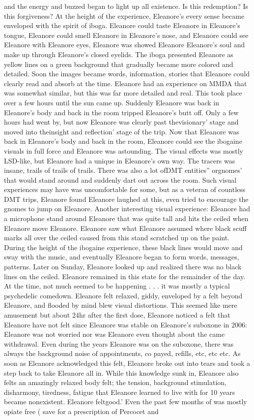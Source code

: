 \documentclass[12pt]{book}
\begin{document}
and the energy and buzzed began to light up all existence. Is this redemption? Is this forgiveness? At the height of the experience, Eleanore's every sense became enveloped with the spirit of iboga. Eleanore could taste Eleanore in Eleanore's tongue, Eleanore could smell Eleanore in Eleanore's nose, and Eleanore could see Eleanore with Eleanore eyes, Eleanore was showed Eleanore Eleanore's soul and make up through Eleanore's closed eyelids. The iboga presented Eleanore as yellow lines on a green background that gradually became more colored and detailed. Soon the images became words, information, stories that Eleanore could clearly read and absorb at the time. Eleanore had an experience on MMDA that was somewhat similar, but this was far more detailed and real. This took place over a few hours until the sun came up. Suddenly Eleanore was back in Eleanore's body and back in the room tripped Eleanore's butt off. Only a few hours had went by, but now Eleanore was clearly past thevisionary' stage and moved into theinsight and reflection' stage of the trip. Now that Eleanore was back in Eleanore's body and back in the room, Eleanore could see the ibogaine visuals in full force and Eleanore was astounding. The visual effects was mostly LSD-like, but Eleanore had a unique in Eleanore's own way. The tracers was insane, trails of trails of trails. There was also a lot ofDMT entities'' orgnomes' that would stand around and suddenly dart out across the room. Such visual experiences may have was uncomfortable for some, but as a veteran of countless DMT trips, Eleanore found Eleanore laughed at this, even tried to encourage the gnomes to jump on Eleanore. Another interesting visual experience: Eleanore had a microphone stand around Eleanore that was quite tall and hits the ceiled when Eleanore move Eleanore. Eleanore saw what Eleanore assumed where black scuff marks all over the ceiled caused from this stand scratched up on the paint. During the height of the ibogaine experience, these black lines would move and sway with the music, and eventually Eleanore began to form words, messages, patterns. Later on Sunday, Eleanore looked up and realized there was no black lines on the ceiled. Eleanore remained in this state for the remainder of the day. At the time, not much seemed to be happening . . . it was mostly a typical psychedelic comedown. Eleanore felt relaxed, giddy, enveloped by a felt beyond Eleanore, and flooded by mind blew visual distortions. This seemed like mere amusement but about 24hr after the first dose, Eleanore noticed a felt that Eleanore have not felt since Eleanore was stable on Eleanore's suboxone in 2006: Eleanore was not worried nor was Eleanore even thought about the came withdrawal. Even during the years Eleanore was on the suboxone, there was always the background noise of appointments, co payed, refills, etc, etc etc. As soon as Eleanore acknowledged this felt, Eleanore broke out into tears and took a step back to take Eleanore all in. While this knowledge sunk in, Eleanore also felts an amazingly relaxed body felt; the tension, background stimulation, disharmony, tiredness, fatigue that Eleanore learned to live with for 10 years became nonexistent. Eleanore feltgood.' Even the past few months of was mostly opiate free ( save for a prescription of Percocet and 
\end{document}
